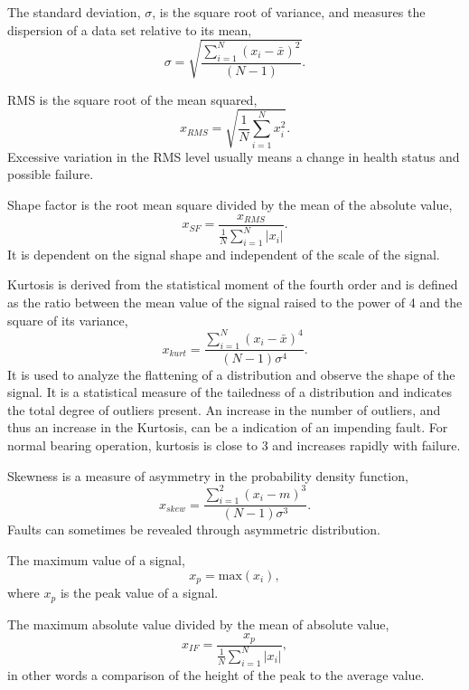 \documentclass[]{article}
\begin{document}
The standard deviation, $\sigma$, is the square root of variance, and measures the dispersion of a data set relative to its mean,
\begin{equation}
	\sigma = \sqrt{\frac{\sum^N_{i=1}(x_i-\bar{x})^2}{(N-1)}}.
\end{equation}

\gls{RMS} is the square root of the mean squared,
\begin{equation}
x_{RMS} = \sqrt{\frac{1}{N} \sum^N_{i=1}x^2_i}.
\end{equation}
Excessive variation in the \gls{RMS} level usually means a change in health status and possible failure.
 
Shape factor is the root mean square divided by the mean of the absolute value,
\begin{equation}
x_{SF} = \frac{ x_{RMS} }  {\frac{1}{N}\sum^N_{i=1}|x_i|}.
\end{equation}
It is dependent on the signal shape and independent of the scale of the signal.

Kurtosis is derived from the statistical moment of the fourth order and is defined as the ratio between the mean value of the signal raised to the power of 4 and the square of its variance, \begin{equation}
x_{kurt} = \frac{\sum^N_{i=1}(x_i-\bar{x})^4}{(N-1)\sigma^4}.
\end{equation}
It is  used to analyze the flattening of a distribution and observe the shape of the signal. It is a statistical measure of the tailedness of a distribution and indicates the total degree of outliers present. An increase in the number of outliers, and thus an increase in the Kurtosis, can be a indication of an impending fault. For normal bearing operation, kurtosis is close to 3 and increases rapidly with failure.

Skewness is a measure of asymmetry in the probability density function,
\begin{equation}
x_{skew} = \frac{\sum^2_{i=1}(x_i-m)^3}{(N-1)\sigma^3}.
\end{equation}
Faults can sometimes be revealed through asymmetric distribution.

The maximum value of a signal,
\begin{equation}
x_p = \textrm{max}(x_i),
\end{equation}
where $x_p$ is the peak value of a signal.

The maximum absolute value divided by the mean of absolute value,
\begin{equation}
x_{IF} = \frac{x_p}{\frac{1}{N}\sum^N_{i=1}|x_i|},
\end{equation}
in other words a comparison of the height of the peak to the average value.
\end{document}
